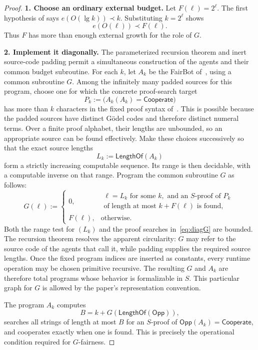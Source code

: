 \documentclass[11pt]{article}
\theoremstyle{definition}
\theoremstyle{remark}
\newcommand{\Coop}{\mathsf{Cooperate}}
\newcommand{\Len}{\mathsf{LengthOf}}
\newcommand{\CritchCooperationRef}{\cite[Theorem~5.1]{Critch}}
\begin{document}
\begin{proof}
\textbf{1. Choose an ordinary external budget.}
Let $F(\ell)=2^\ell$.  The first hypothesis of \CritchCooperationRef{} says $e(O(\lg k))\prec k$.  Substituting $k=2^\ell$ shows
\[
  e(O(\ell))\prec F(\ell).
\]
Thus $F$ has more than enough external growth for the role of $G$.

\medskip
\noindent
\textbf{2. Implement it diagonally.}
The parameterized recursion theorem and inert source-code padding permit a simultaneous construction of the agents and their common budget subroutine.  For each $k$, let $A_k$ be the FairBot of~\cite{Critch}, using a common subroutine $G$.  Among the infinitely many padded sources for this program, choose one for which the concrete proof-search target
\[
  P_k:=\bigl(A_k(A_k)=\Coop\bigr)
\]
has more than $k$ characters in the fixed proof syntax of~\cite{Critch}.  This is possible because the padded sources have distinct G\"odel codes and therefore distinct numeral terms.  Over a finite proof alphabet, their lengths are unbounded, so an appropriate source can be found effectively.  Make these choices successively so that the exact source lengths
\[
  L_k:=\Len(A_k)
\]
form a strictly increasing computable sequence.  Its range is then decidable, with a computable inverse on that range.  Program the common subroutine $G$ as follows:
\[
G(\ell):=
\begin{cases}
0,
 &\begin{array}{l}
   \ell=L_k\text{ for some }k,\text{ and an }S\text{-proof of }P_k\\[-2pt]
   \text{of length at most }k+F(\ell)\text{ is found},
  \end{array}\\[10pt]
F(\ell),&\text{otherwise.}
\end{cases}
\tag{5.9}\label{eq:diagG}
\]
Both the range test for $(L_k)$ and the proof searches in~\eqref{eq:diagG} are bounded.  The recursion theorem resolves the apparent circularity: $G$ may refer to the source code of the agents that call it, while padding supplies the required source lengths.  Once the fixed program indices are inserted as constants, every runtime operation may be chosen primitive recursive.  The resulting $G$ and $A_k$ are therefore total programs whose behavior is formalizable in $S$.  This particular graph for $G$ is allowed by the paper's representation convention.

The program $A_k$ computes
\[
  B=k+G(\Len(\mathsf{Opp})),
\]
searches all strings of length at most $B$ for an $S$-proof of $\mathsf{Opp}(A_k)=\Coop$, and cooperates exactly when one is found.  This is precisely the operational condition required for $G$-fairness.


\end{proof}
\end{document}
